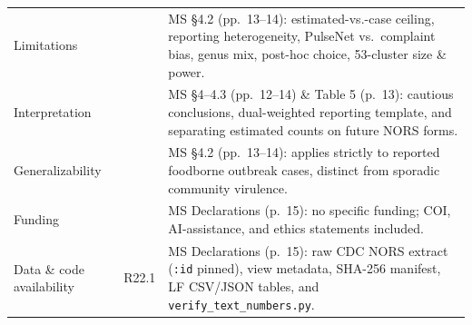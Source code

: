 \documentclass[11pt,a4paper]{article}
\begin{document}
\begin{table}[!htbp]
\begin{tabular}{>{\raggedright\arraybackslash}p{2.3cm} >{\raggedright\arraybackslash}p{1.5cm} >{\raggedright\arraybackslash}p{10.2cm}}
Limitations & 19 & MS §4.2 (pp.\ 13--14): estimated-vs.-case ceiling, reporting heterogeneity, PulseNet vs.\ complaint bias, genus mix, post-hoc choice, 53-cluster size \& power. \\
Interpretation & 20 & MS §4--4.3 (pp.\ 12--14) \& Table 5 (p.\ 13): cautious conclusions, dual-weighted reporting template, and separating estimated counts on future NORS forms. \\
Generalizability & 21 & MS §4.2 (pp.\ 13--14): applies strictly to reported foodborne outbreak cases, distinct from sporadic community virulence. \\
Funding & 22 & MS Declarations (p.\ 15): no specific funding; COI, AI-assistance, and ethics statements included. \\
Data \& code availability & R22.1 & MS Declarations (p.\ 15): raw CDC NORS extract (\texttt{:id} pinned), view metadata, SHA-256 manifest, LF CSV/JSON tables, and \texttt{verify\_text\_numbers.py}. \\
\bottomrule
\end{tabular}
\end{table}
\end{document}
